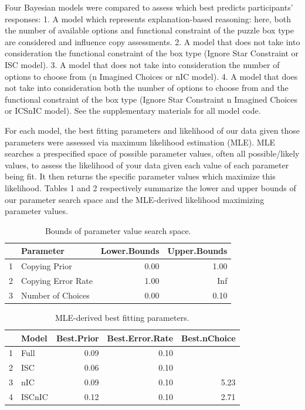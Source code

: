 \documentclass[10pt, letterpaper]{article}
\begin{document}
Four Bayesian models were compared to assess which best predicts
participants' responses: 1. A model which represents explanation-based
reasoning: here, both the number of available options and functional
constraint of the puzzle box type are considered and influence copy
assessments. 2. A model that does not take into consideration the
functional constraint of the box type (Ignore Star Constraint or ISC
model). 3. A model that does not take into consideration the number of
options to choose from (n Imagined Choices or nIC model). 4. A model
that does not take into consideration both the number of options to
choose from and the functional constraint of the box type (Ignore Star
Constraint n Imagined Choices or ICSnIC model). See the supplementary
materials for all model code.

For each model, the best fitting parameters and likelihood of our data
given those parameters were assessed via maximum likelihood estimation
(MLE). MLE searches a prespecified space of possible parameter values,
often all possible/likely values, to assess the likelihood of your data
given each value of each parameter being fit. It then returns the
specific parameter values which maximize this likelihood. Tables 1 and 2
respectively summarize the lower and upper bounds of our parameter
search space and the MLE-derived likelihood maximizing parameter values.

\begin{table}[H]
\centering
\begin{tabular}{rlrr}
  \hline
 & Parameter & Lower.Bounds & Upper.Bounds \\ 
  \hline
1 & Copying Prior & 0.00 & 1.00 \\ 
  2 & Copying Error Rate & 1.00 & Inf \\ 
  3 & Number of Choices & 0.00 & 0.10 \\ 
   \hline
\end{tabular}
\caption{Bounds of parameter value search space.} 
\end{table}

\begin{table}[H]
\centering
\begin{tabular}{rlrrr}
  \hline
 & Model & Best.Prior & Best.Error.Rate & Best.nChoice \\ 
  \hline
1 & Full & 0.09 & 0.10 &  \\ 
  2 & ISC & 0.06 & 0.10 &  \\ 
  3 & nIC & 0.09 & 0.10 & 5.23 \\ 
  4 & ISCnIC & 0.12 & 0.10 & 2.71 \\ 
   \hline
\end{tabular}
\caption{MLE-derived best fitting parameters.} 
\end{table}
\end{document}
